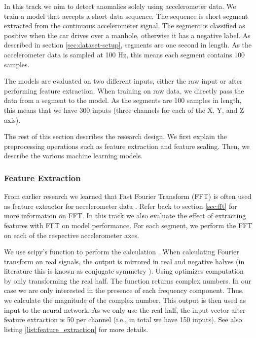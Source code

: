 In this track we aim to detect anomalies solely using accelerometer data. We train a model that accepts a short data sequence. The sequence is short segment extracted from the continuous accelerometer signal. The segment is classified as positive when the car drives over a manhole, otherwise it has a negative label. As described in section \ref{sec:dataset-setup}, segments are one second in length. As the accelerometer data is sampled at 100 Hz, this means each segment contains 100 samples.

The models are evaluated on two different inputs, either the raw input or after performing feature extraction. When training on raw data, we directly pass the data from a segment to the model. As the segments are 100 samples in length, this means that we have 300 inputs (three channels for each of the X, Y, and Z axis). 

The rest of this section describes the research design. We first explain the preprocessing operations such as feature extraction and feature scaling. Then, we describe the various machine learning models.


\subsubsection{Feature Extraction}

From earlier research we learned that Fast Fourier Transform (FFT) is often used as feature extractor for accelerometer data \cite{Hanson2014,Basavaraju2019,Wu2020,Janani2020}. Refer back to section \ref{sec:fft} for more information on FFT. In this track we also evaluate the effect of extracting features with FFT on model performance. For each segment, we perform the FFT on each of the respective accelerometer axes. 

We use scipy's  function to perform the calculation \cite{scipy}. When calculating Fourier transform on real signals, the output is mirrored in real and negative halves (in literature this is known as conjugate symmetry \cite{Smith1997}). Using  optimizes computation by only transforming the real half. The function returns complex numbers. In our case we are only interested in the presence of each frequency component. Thus, we calculate the magnitude of the complex number. This output is then used as input to the neural network. As we only use the real half, the input vector after feature extraction is 50 per channel (i.e., in total we have 150 inputs). See also listing \ref{list:feature_extraction} for more details.


